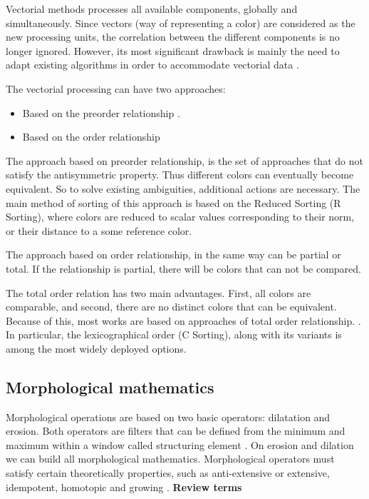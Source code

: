 Vectorial methods processes all available components, globally and simultaneously.
Since vectors (way of representing a color) are considered as the new processing units, the correlation between the different components is no longer ignored. However, its most significant drawback is mainly the need to adapt existing algorithms in order to accommodate vectorial data \cite{aptoula2007comparative}.

The vectorial processing can have two approaches:
 
\begin{itemize}
    \item Based on the preorder relationship .
    \item Based on the order relationship 
\end{itemize}

The approach based on preorder relationship, is the set of approaches that do not satisfy the antisymmetric property.  Thus different colors can eventually become equivalent. So to solve existing ambiguities, additional actions are necessary. The main method of sorting of this approach is based on the Reduced Sorting (R Sorting), where colors are reduced to scalar values corresponding to their norm, or their distance to a some reference color. 

The approach based on order relationship, in the same way can be partial or total. If the relationship is partial, there will be colors that can not be compared. 

The total order relation has two main advantages. First, all colors are comparable, and second, there are no distinct colors that can be equivalent. Because of this, most works are based on approaches of total order relationship. \cite{aptoula2007comparative}. In particular, the lexicographical order (C Sorting), along with its variants is among the most widely deployed options.  

\subsection{Morphological mathematics}

Morphological operations are based on two basic operators: dilatation and erosion. Both operators are filters that can be defined from the minimum and maximum within a window called structuring element \cite{serra1986introduction}. On erosion and dilation we can build all morphological mathematics. Morphological operators must satisfy certain theoretically properties, such as anti-extensive or extensive, idempotent, homotopic and growing \cite{serra1986introduction}. \textbf{Review terms} %

